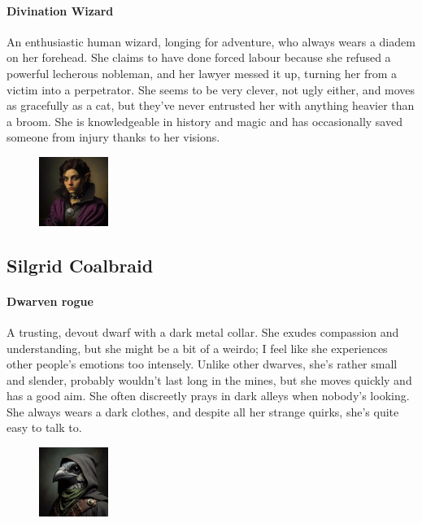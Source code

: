 \documentclass[10pt,onecolumn,twoside,openany,bg=full,layout=true]{dndbook}
\begin{document}
  \paragraph{Divination Wizard}
  An enthusiastic human wizard, longing for adventure, who always wears a diadem on her forehead.
  She claims to have done forced labour because she refused a powerful lecherous nobleman, and her lawyer messed it up,
  turning her from a victim into a perpetrator.
  She seems to be very clever, not ugly either, and moves as gracefully as a cat, but they've never entrusted her
  with anything heavier than a broom.
  She is knowledgeable in history and magic and has occasionally saved someone from injury thanks to her visions.


  \begin{figure}
    \begin{center}
      \includegraphics[width=0.2\textwidth]{img/silgrid}
    \end{center}
  \end{figure}
  \subsection{Silgrid Coalbraid}\label{subsec:silgrid-coalbraid}

  \paragraph{Dwarven rogue} A trusting, devout dwarf with a dark metal collar.
  She exudes compassion and understanding, but she might be a bit of a weirdo; I feel like she experiences other
  people's emotions too intensely.
  Unlike other dwarves, she's rather small and slender, probably wouldn't last long
  in the mines, but she moves quickly and has a good aim.
  She often discreetly prays in dark alleys when nobody's looking.
  She always wears a dark clothes, and despite all her strange quirks, she's quite easy to talk to.


  \begin{figure}
    \begin{center}
      \includegraphics[width=0.2\textwidth]{img/sally}
    \end{center}
  \end{figure}
\end{document}
